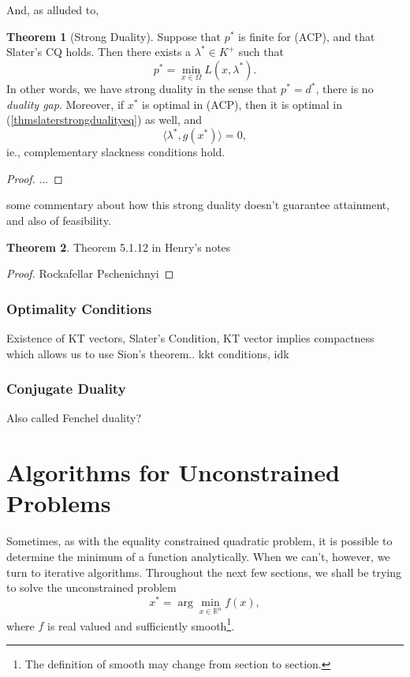 \documentclass{article}
\numberwithin{equation}{section}
\theoremstyle{definition}
\newtheorem{theorem}{Theorem}[section]
\newcommand{\bR}{\mathbb{R}}
\begin{document}
And, as alluded to,
\begin{theorem}[Strong Duality]
    Suppose that $p^*$ is finite for (ACP), and that Slater's CQ holds. Then there exists a $\lambda^*\in K^+$ such that
    \begin{equation}
        \label{thmslaterstrongdualityeq}
        p^*=\min_{x\in\Omega} L(x,\lambda^*).
    \end{equation}
    In other words, we have strong duality in the sense that $p^*=d^*$, there is no \textit{duality gap}. Moreover, if $x^*$ is optimal in (ACP), then it is optimal in (\ref{thmslaterstrongdualityeq}) as well, and
    \begin{equation}
        \langle \lambda^*,g(x^*)\rangle=0,
    \end{equation}
    ie., complementary slackness conditions hold.
\end{theorem}
\begin{proof}
...
\end{proof}
some commentary about how this strong duality doesn't guarantee attainment, and also of feasibility.
\begin{theorem}
    Theorem 5.1.12 in Henry's notes
\end{theorem}
\begin{proof}
    Rockafellar Pschenichnyi
\end{proof}
\subsubsection{Optimality Conditions}

Existence of KT vectors, Slater's Condition, KT vector implies compactness which allows us to use Sion's theorem.. kkt conditions, idk
\subsubsection{Conjugate Duality}
Also called Fenchel duality?
\section{Algorithms for Unconstrained Problems}
Sometimes, as with the equality constrained quadratic problem, it is possible to determine the minimum of a function analytically. When we can't, however, we turn to iterative algorithms. Throughout the next few sections, we shall be trying to solve the unconstrained problem
\begin{equation}x^*=\arg\min_{x\in\bR^n} f(x),\end{equation}
where $f$ is real valued and sufficiently smooth\footnote{The definition of smooth may change from section to section.}.
\end{document}
